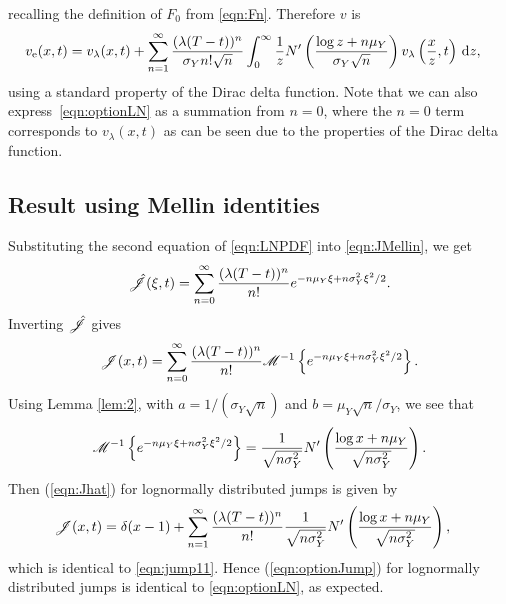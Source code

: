 recalling the definition of $F_0$ from \eqref{eqn:Fn}. Therefore $v$ is
	\begin{align}
		\label{eqn:optionLN}
		\begin{split}
		v_\text{e}(x,t) &= v_\lambda(x,t) + \displaystyle\sum\limits_{n=1}^\infty\frac{(\lambda(T-t))^n}{\sigma_Yn!\sqrt{n}}\int_0^\infty \frac{1}{z}N'\left( \frac{\log z + n\mu_Y}{\sigma_Y\sqrt{n}} \right)v_\lambda\left( \frac{x}{z},t \right)\, \mathrm d z,
		\end{split}
	\end{align}
using a standard property of the Dirac delta function. Note that we can also express~\eqref{eqn:optionLN} as a summation from $n=0$, where the $n = 0$ term corresponds to $v_\lambda(x,t)$ as can be seen due to the properties of the Dirac delta function.



\subsection{Result using Mellin identities}
Substituting the second equation of \eqref{eqn:LNPDF} into \eqref{eqn:JMellin}, we get
	\begin{equation*}
		\hat {\mathscr J}(\xi,t) = \displaystyle\sum\limits_{n=0}^\infty \frac{(\lambda(T-t))^n}{n!}e^{-n\mu_Y\xi + n\sigma_Y^2\xi^2/2}.
	\end{equation*}
Inverting $\hat {\mathscr J}$ gives
	\begin{equation*}
		\mathscr J(x,t) = \displaystyle\sum\limits_{n=0}^\infty\frac{(\lambda(T-t))^n}{n!} \mathscr M^{-1}\left\{ e^{-n\mu_Y\xi + n\sigma_Y^2\xi^2/2} \right\}.
	\end{equation*}
Using Lemma \ref{lem:2}, with $a = 1/(\sigma_Y\sqrt{n})$ and $b = \mu_Y\sqrt{n}/\sigma_Y$, we see that
	\begin{equation*}
		\mathscr M^{-1}\left\{ e^{-n\mu_Y\xi + n\sigma_Y^2\xi^2/2} \right\} = \frac{1}{\sqrt{n\sigma_Y^2}} N'\left( \frac{\log x + n\mu_Y}{\sqrt{n\sigma_Y^2}} \right).
	\end{equation*}
Then (\ref{eqn:Jhat}) for lognormally distributed jumps is given by
	\begin{align}
		\label{eqn:jump12}
		\begin{split}
		\mathscr J(x,t) &= \delta(x-1) + \sum\limits_{n=1}^\infty \frac{(\lambda(T-t))^n}{n!}\frac{1}{\sqrt{n\sigma_Y^2}}N'\left( \frac{\log x + n\mu_Y}{\sqrt{n\sigma_Y^2}} \right),
		\end{split}
	\end{align}
which is identical to \eqref{eqn:jump11}. Hence (\ref{eqn:optionJump}) for lognormally distributed jumps is identical to \eqref{eqn:optionLN}, as expected.

